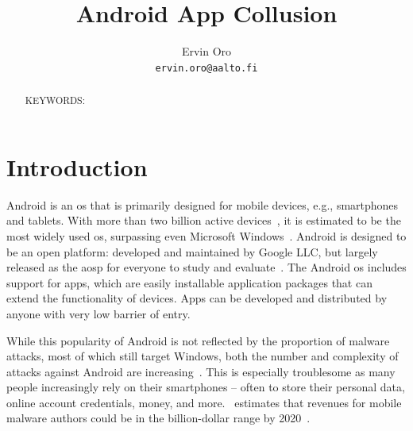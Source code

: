 \documentclass[article, oneside]{aaltoseries}
\title{Android App Collusion}
\author{Ervin Oro%
\\\textnormal{\texttt{ervin.oro@aalto.fi}}} %
\affiliation{\textbf{Tutor}: Jorden Whitefield} %
\newcommand{\TODO}[1]{\todo[inline]{#1}}
\begin{document}

\maketitle
{}

\begin{abstract}
\TODO{abstract}

\vspace{3mm}
\noindent KEYWORDS: 

\end{abstract}


\section{Introduction}
\label{sec:intro}

Android is an \gls{os} that is primarily designed for mobile devices, e.g., smartphones and tablets. With more than two billion active devices~\cite{AOSP2018}, it is estimated to be the most widely used \gls{os}, surpassing even Microsoft Windows~\cite{AWSLLC2018, StatCounter2018}. Android is designed to be an open platform: developed and maintained by Google LLC, but largely released as the \gls{aosp} for everyone to study and evaluate~\cite{AOSP}. The Android \gls{os} includes support for apps, which are easily installable application packages that can extend the functionality of devices. Apps can be developed and distributed by anyone with very low barrier of entry.

While this popularity of Android is not reflected by the proportion of malware attacks, most of which still target Windows, both the number and complexity of attacks against Android are increasing~\cite{AVTESTGH2018}. This is especially troublesome as many people increasingly rely on their smartphones -- often to store their personal data, online account credentials, money, and more.~\citeauthor{McAfee2018} estimates that revenues for mobile malware authors could be in the billion-dollar range by 2020~\cite{McAfee2018}.
\end{document}

